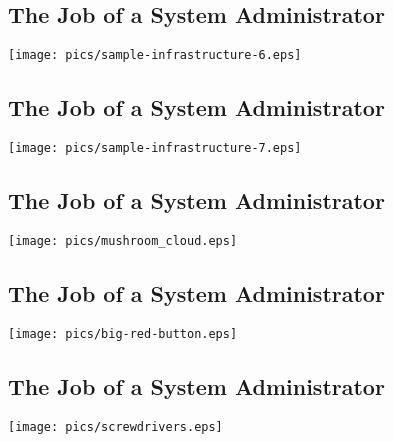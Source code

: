 \documentclass[xga]{xdvislides}
\begin{document}
\subsection{The Job of a System Administrator}
\vspace*{\fill}
\begin{center}
	\texttt{[image: pics/sample-infrastructure-6.eps]} \\
\end{center}
\vspace*{\fill}

\subsection{The Job of a System Administrator}
\vspace*{\fill} \begin{center}
\texttt{[image: pics/sample-infrastructure-7.eps]}
\\ \end{center} \vspace*{\fill}

\subsection{The Job of a System Administrator}
\vspace*{\fill}
\begin{center}
	\texttt{[image: pics/mushroom\_cloud.eps]} \\
\end{center}
\vspace*{\fill}



\subsection{The Job of a System Administrator}
\vspace*{\fill}
\begin{center}
	\texttt{[image: pics/big-red-button.eps]} \\
\end{center}
\vspace*{\fill}

\subsection{The Job of a System Administrator}
\vspace*{\fill}
\begin{center}
	\texttt{[image: pics/screwdrivers.eps]} \\
\end{center}
\vspace*{\fill}
\end{document}
